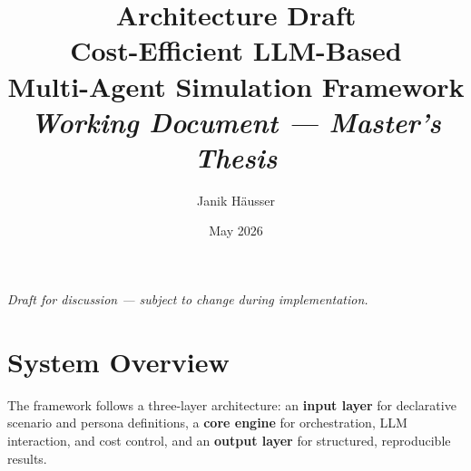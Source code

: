 \documentclass[12pt, a4paper]{article}
\title{%
    \vspace{-1cm}
    \textbf{Architecture Draft}\\[0.6em]
    \Large Cost-Efficient LLM-Based\\
    Multi-Agent Simulation Framework\\[0.8em]
    \normalsize\textit{Working Document --- Master's Thesis}
}
\author{Janik H\"ausser}
\date{May 2026}
\begin{document}
\maketitle
\thispagestyle{empty}
\vfill
\begin{center}
    \textit{Draft for discussion --- subject to change during implementation.}
\end{center}
\newpage

\setcounter{page}{1}
\tableofcontents
\newpage

\section{System Overview}
\label{sec:overview}

The framework follows a three-layer architecture: an \textbf{input layer} for declarative scenario and persona definitions, a \textbf{core engine} for orchestration, LLM interaction, and cost control, and an \textbf{output layer} for structured, reproducible results.
\end{document}
